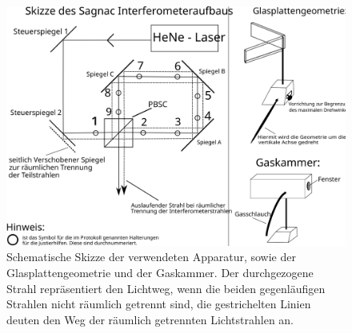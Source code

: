 \begin{figure}[]
  \centering
  \includegraphics[width=1\textwidth]{figures/bauteile}
  \caption{Schematische Skizze der verwendeten Apparatur, sowie der 
   Glasplattengeometrie und der Gaskammer. Der durchgezogene Strahl 
    repräsentiert den Lichtweg, wenn die beiden gegenläufigen 
    Strahlen nicht räumlich getrennt sind, die gestrichelten Linien 
     deuten den Weg der räumlich getrennten Lichtstrahlen an.}
  \label{fig:bauteile}
\end{figure}
%
